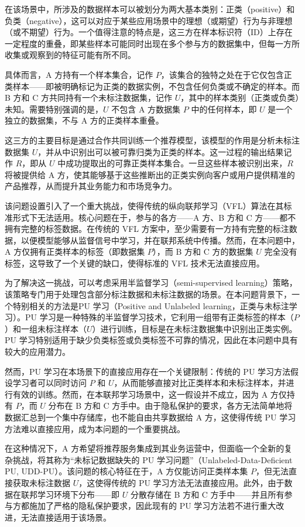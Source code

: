 在该场景中，所涉及的数据样本可以被划分为两大基本类别：正类（positive）和负类（negative），这可以对应于某些应用场景中的理想（或期望）行为与非理想（或不期望）行为。一个值得注意的特点是，这三方在样本标识符（ID）上存在一定程度的重叠，即某些样本可能同时出现在多个参与方的数据集中，但每一方所收集或观察到的特征可能有所不同。

具体而言，A 方持有一个样本集合，记作 $ P $，该集合的独特之处在于它仅包含正类样本——即被明确标记为正类的数据实例，不包含任何负类或不确定的样本。而 B 方和 C 方共同持有一个未标注数据集，记作 $ U $，其中的样本类别（正类或负类）未知。需要特别强调的是，$ U $ 不包含 A 方数据集 $ P $ 中的任何样本，即 $ U $ 是一个独立的数据集，不与 A 方的正类样本重叠。

这三方的主要目标是通过合作共同训练一个推荐模型，该模型的作用是分析未标注数据集 $ U $，并从中识别出可以被可靠归类为正类的样本。这一过程的输出结果记作 $ R $，即从 $ U $ 中成功提取出的可靠正类样本集合。一旦这些样本被识别出来，$ R $ 将被提供给 A 方，使其能够基于这些推断出的正类实例向客户或用户提供精准的产品推荐，从而提升其业务能力和市场竞争力。

该问题设置引入了一个重大挑战，使得传统的纵向联邦学习（VFL）算法在其标准形式下无法适用。核心问题在于，参与的各方——A 方、B 方和 C 方——都不拥有完整的标签数据。在传统的 VFL 方案中，至少需要有一方持有完整的标注数据，以便模型能够从监督信号中学习，并在联邦系统中传播。然而，在本问题中，A 方仅拥有正类样本的标签（即数据集 $ P $），而 B 方和 C 方的数据集 $ U $ 完全没有标签，这导致了一个关键的缺口，使得标准的 VFL 技术无法直接应用。

为了解决这一挑战，可以考虑采用半监督学习（semi-supervised learning）策略，该策略专门用于处理包含部分标注数据和未标注数据的场景。在本问题背景下，一个特别相关的方法是PU 学习（Positive and Unlabeled learning，正类与未标注学习）。PU 学习是一种特殊的半监督学习技术，它利用一组带有正类标签的样本（$ P $）和一组未标注样本（$ U $）进行训练，目标是在未标注数据集中识别出正类实例。PU 学习特别适用于缺少负类标签或负类标签不可靠的情况，因此在本问题中具有较大的应用潜力。

然而，PU 学习在本场景下的直接应用存在一个关键限制：传统的 PU 学习方法假设学习者可以同时访问 $ P $ 和 $ U $，从而能够直接对比正类样本和未标注样本，并进行有效的训练。然而，在本联邦学习场景中，这一假设并不成立，因为 A 方仅持有 $ P $，而 $ U $ 分布在 B 方和 C 方手中。由于隐私保护的要求，各方无法简单地将数据汇总到一个集中存储库，也不能自由共享数据给 A 方，这使得传统 PU 学习方法难以直接应用，成为本问题的一个重要挑战。

在这种情况下，A 方希望将推荐服务集成到其业务运营中，但面临一个全新的复杂挑战，将其称为“未标记数据缺失的 PU 学习问题”（Unlabeled-Data-Deficient PU, UDD-PU）。该问题的核心特征在于，A 方仅能访问正类样本集 $ P $，但无法直接获取未标注数据 $ U $，这使得传统的 PU 学习方法无法直接应用。此外，由于数据在联邦学习环境下分布——即 $ U $ 分散存储在 B 方和 C 方手中——并且所有参与方都施加了严格的隐私保护要求，因此现有的 PU 学习方法若不进行重大改进，无法直接适用于该场景。

